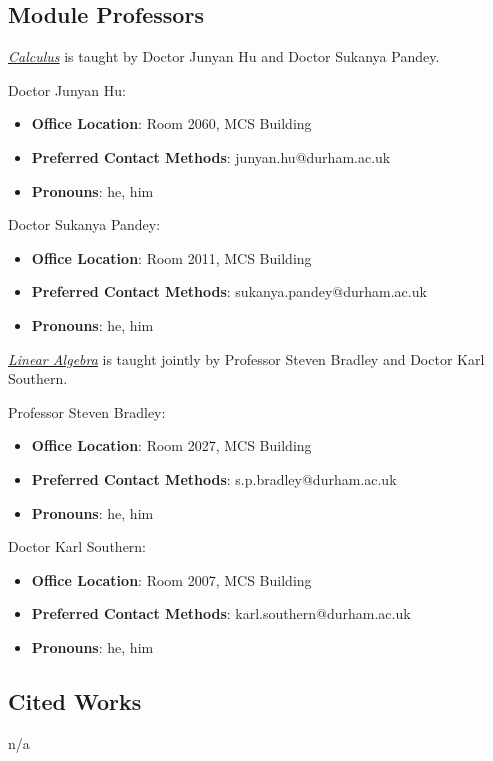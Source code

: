 \subsection{Module Professors}

\hyperref[mcs:section:1.calc]{\textit{Calculus}} is taught by Doctor Junyan Hu and Doctor Sukanya Pandey.
        
Doctor Junyan Hu:
\begin{itemize}
    \item \textbf{Office Location}: Room 2060, MCS Building
    \item \textbf{Preferred Contact Methods}: junyan.hu@durham.ac.uk
    \item \textbf{Pronouns}: he, him
\end{itemize}
Doctor Sukanya Pandey:
\begin{itemize}
    \item \textbf{Office Location}: Room 2011, MCS Building
    \item \textbf{Preferred Contact Methods}: sukanya.pandey@durham.ac.uk
    \item \textbf{Pronouns}: he, him
\end{itemize}

\hyperref[mcs:section:2.la]{\textit{Linear Algebra}} is taught jointly by Professor Steven Bradley and Doctor Karl Southern.

Professor Steven Bradley:
\begin{itemize}
    \item \textbf{Office Location}: Room 2027, MCS Building
    \item \textbf{Preferred Contact Methods}: s.p.bradley@durham.ac.uk
    \item \textbf{Pronouns}: he, him
\end{itemize}
Doctor Karl Southern:
\begin{itemize}
    \item \textbf{Office Location}: Room 2007, MCS Building
    \item \textbf{Preferred Contact Methods}: karl.southern@durham.ac.uk
    \item \textbf{Pronouns}: he, him
\end{itemize}

\subsection{Cited Works}

n/a